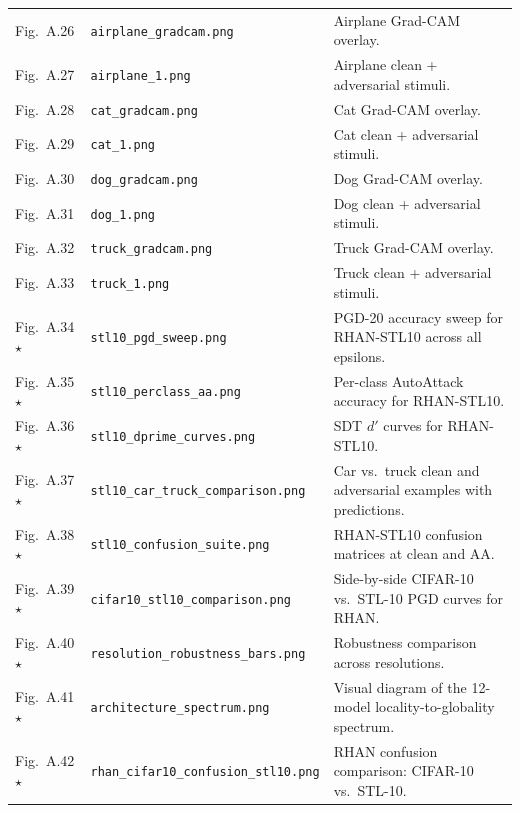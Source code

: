\documentclass[12pt,a4paper]{article}
\begin{document}
\begin{longtable}{>{\raggedright\arraybackslash}p{2.1cm} >{\raggedright\arraybackslash}p{5.2cm} >{\raggedright\arraybackslash}p{\dimexpr\textwidth-2.1cm-5.2cm-4\tabcolsep\relax}}
Fig.~A.26 & \texttt{airplane\_\allowbreak{}gradcam.png} &
Airplane Grad-CAM overlay. \\
Fig.~A.27 & \texttt{airplane\_\allowbreak{}1.png} &
Airplane clean + adversarial stimuli. \\
Fig.~A.28 & \texttt{cat\_\allowbreak{}gradcam.png} &
Cat Grad-CAM overlay. \\
Fig.~A.29 & \texttt{cat\_\allowbreak{}1.png} &
Cat clean + adversarial stimuli. \\
Fig.~A.30 & \texttt{dog\_\allowbreak{}gradcam.png} &
Dog Grad-CAM overlay. \\
Fig.~A.31 & \texttt{dog\_\allowbreak{}1.png} &
Dog clean + adversarial stimuli. \\
Fig.~A.32 & \texttt{truck\_\allowbreak{}gradcam.png} &
Truck Grad-CAM overlay. \\
Fig.~A.33 & \texttt{truck\_\allowbreak{}1.png} &
Truck clean + adversarial stimuli. \\
\midrule
Fig.~A.34$\star$ & \texttt{stl10\_\allowbreak{}pgd\_\allowbreak{}sweep.png} &
PGD-20 accuracy sweep for RHAN-STL10 across all epsilons. \\
Fig.~A.35$\star$ & \texttt{stl10\_\allowbreak{}perclass\_\allowbreak{}aa.png} &
Per-class AutoAttack accuracy for RHAN-STL10. \\
Fig.~A.36$\star$ & \texttt{stl10\_\allowbreak{}dprime\_\allowbreak{}curves.png} &
SDT $d'$ curves for RHAN-STL10. \\
Fig.~A.37$\star$ & \texttt{stl10\_\allowbreak{}car\_\allowbreak{}truck\_\allowbreak{}comparison.png} &
Car vs.\ truck clean and adversarial examples with predictions. \\
Fig.~A.38$\star$ & \texttt{stl10\_\allowbreak{}confusion\_\allowbreak{}suite.png} &
RHAN-STL10 confusion matrices at clean and AA. \\
Fig.~A.39$\star$ & \texttt{cifar10\_\allowbreak{}stl10\_\allowbreak{}comparison.png} &
Side-by-side CIFAR-10 vs.\ STL-10 PGD curves for RHAN. \\
Fig.~A.40$\star$ & \texttt{resolution\_\allowbreak{}robustness\_\allowbreak{}bars.png} &
Robustness comparison across resolutions. \\
\midrule
Fig.~A.41$\star$ & \texttt{architecture\_\allowbreak{}spectrum.png} &
Visual diagram of the 12-model locality-to-globality spectrum. \\
Fig.~A.42$\star$ & \texttt{rhan\_\allowbreak{}cifar10\_\allowbreak{}confusion\_\allowbreak{}stl10.png} &
RHAN confusion comparison: CIFAR-10 vs.\ STL-10. \\

\end{longtable}
\end{document}

